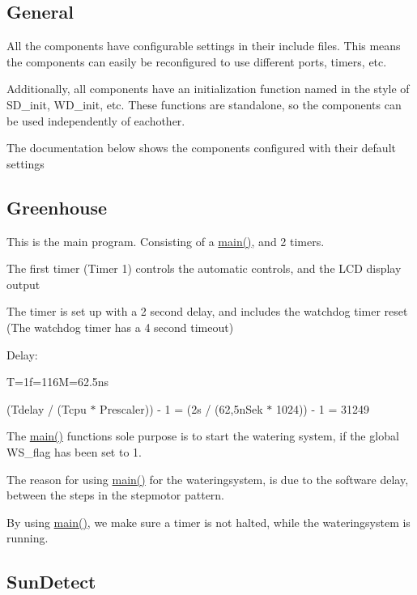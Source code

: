 \subsection*{General}

All the components have configurable settings in their include files. This means the components can easily be reconfigured to use different ports, timers, etc.

Additionally, all components have an initialization function named in the style of S\+D\+\_\+init, W\+D\+\_\+init, etc. These functions are standalone, so the components can be used independently of eachother.

The documentation below shows the components configured with their default settings

\subsection*{Greenhouse}

This is the main program. Consisting of a \mbox{\hyperlink{main_8c_a840291bc02cba5474a4cb46a9b9566fe}{main()}}, and 2 timers.

The first timer (Timer 1) controls the automatic controls, and the L\+CD display output

The timer is set up with a 2 second delay, and includes the watchdog timer reset (The watchdog timer has a 4 second timeout)

Delay\+:


\begin{DoxyItemize}
\item T=1f=116M=62.\+5ns
\item (Tdelay / (Tcpu $\ast$ Prescaler)) -\/ 1 = (2s / (62,5n\+Sek $\ast$ 1024)) -\/ 1 = 31249
\end{DoxyItemize}

The \mbox{\hyperlink{main_8c_a840291bc02cba5474a4cb46a9b9566fe}{main()}} functions sole purpose is to start the watering system, if the global W\+S\+\_\+flag has been set to 1.

The reason for using \mbox{\hyperlink{main_8c_a840291bc02cba5474a4cb46a9b9566fe}{main()}} for the wateringsystem, is due to the software delay, between the steps in the stepmotor pattern.

By using \mbox{\hyperlink{main_8c_a840291bc02cba5474a4cb46a9b9566fe}{main()}}, we make sure a timer is not halted, while the wateringsystem is running.

\subsection*{Sun\+Detect}


